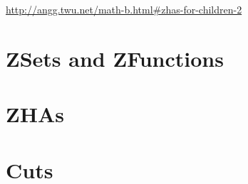 \documentclass[oneside]{article}
\begin{document}
\url{http://angg.twu.net/math-b.html#zhas-for-children-2}

\msk


%                                        





%

\section{ZSets and ZFunctions}


%                         

\section{ZHAs}



%                     

\section{Cuts}
\end{document}
